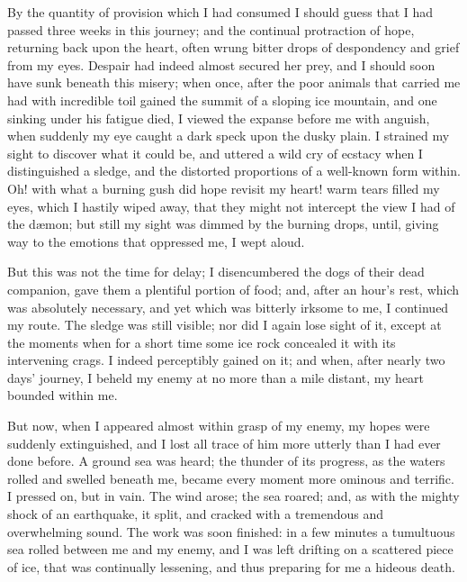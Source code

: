 By the quantity of provision which
I had consumed I should guess that I
had passed three weeks in this journey;
and the continual protraction of
hope, returning back upon the heart,
often wrung bitter drops of despondency
and grief from my eyes. Despair
had indeed almost secured her
prey, and I should soon have sunk beneath
this misery; when once, after
the poor animals that carried me had
with incredible toil gained the summit
of a sloping ice mountain, and one sinking
under his fatigue died, I viewed the
expanse before me with anguish, when
suddenly my eye caught a dark speck
upon the dusky plain. I strained my
sight to discover what it could be, and
uttered a wild cry of ecstacy when I
distinguished a sledge, and the distorted
proportions of a well-known form
within. Oh! with what a burning
gush did hope revisit my heart! warm
tears filled my eyes, which I hastily
wiped away, that they might not intercept
the view I had of the dæmon; but
still my sight was dimmed by the burning
drops, until, giving way to the emotions
that oppressed me, I wept aloud.

But this was not the time for delay;
I disencumbered the dogs of their dead
companion, gave them a plentiful portion
of food; and, after an hour's rest,
which was absolutely necessary, and
yet which was bitterly irksome to me,
I continued my route. The sledge was
still visible; nor did I again lose sight
of it, except at the moments when for a
short time some ice rock concealed it
with its intervening crags. I indeed
perceptibly gained on it; and when,
after nearly two days' journey, I beheld
my enemy at no more than a mile distant,
my heart bounded within me.

But now, when I appeared almost
within grasp of my enemy, my hopes
were suddenly extinguished, and I lost
all trace of him more utterly than I
had ever done before. A ground sea
was heard; the thunder of its progress,
as the waters rolled and swelled beneath
me, became every moment more ominous
and terrific. I pressed on, but in
vain. The wind arose; the sea roared;
and, as with the mighty shock of an
earthquake, it split, and cracked with a
tremendous and overwhelming sound.
The work was soon finished: in a few
minutes a tumultuous sea rolled between
me and my enemy, and I was left
drifting on a scattered piece of ice, that
was continually lessening, and thus
preparing for me a hideous death.

